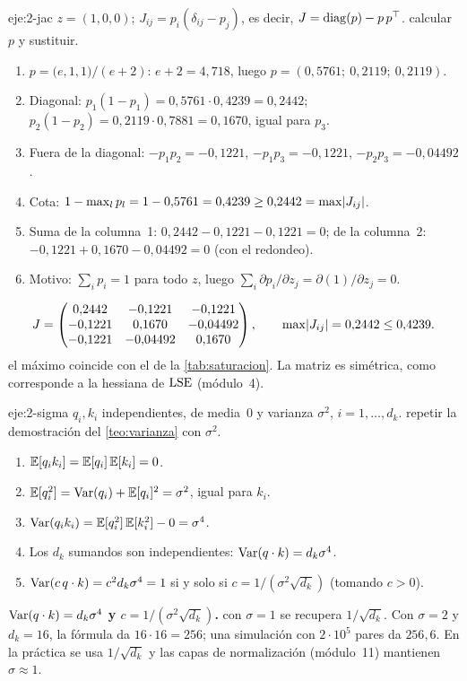 \begin{solucion}{eje:2-jac}
\datos $z=(1,0,0)$; $J_{ij}=p_i(\delta_{ij}-p_j)$, es decir, $J=\operatorname{diag}(p)-p\,p^{\top}$.
\planteamiento calcular $p$ y sustituir.
\pasos
\begin{enumerate}[label=\arabic*.]
  \item $p=\bigl(e,1,1\bigr)/(e+2)$: $e+2=4{,}718$, luego $p=(0{,}5761;\allowbreak\ 0{,}2119;\allowbreak\ 0{,}2119)$.
  \item Diagonal: $p_1(1-p_1)=0{,}5761\cdot0{,}4239=0{,}2442$; $p_2(1-p_2)=0{,}2119\cdot0{,}7881=0{,}1670$, igual para $p_3$.
  \item Fuera de la diagonal: $-p_1p_2=-0{,}1221$, $-p_1p_3=-0{,}1221$, $-p_2p_3=-0{,}04492$.
  \item Cota: $1-\max_lp_l=1-0{,}5761=0{,}4239\ge0{,}2442=\max\lvert J_{ij}\rvert$.
  \item Suma de la columna~1: $0{,}2442-0{,}1221-0{,}1221=0$; de la columna~2: $-0{,}1221+0{,}1670-0{,}04492=0$ (con el redondeo).
  \item Motivo: $\sum_ip_i=1$ para todo $z$, luego $\sum_i\partial p_i/\partial z_j=\partial(1)/\partial z_j=0$.
\end{enumerate}
\resultado
\[
J=\begin{pmatrix}0{,}2442&-0{,}1221&-0{,}1221\\-0{,}1221&0{,}1670&-0{,}04492\\-0{,}1221&-0{,}04492&0{,}1670\end{pmatrix},\qquad \max\lvert J_{ij}\rvert=0{,}2442\le0{,}4239 .
\]
\comprobacion el máximo coincide con el de la \cref{tab:saturacion}. La matriz es simétrica, como corresponde a la hessiana de $\operatorname{LSE}$ (módulo~4).
\end{solucion}

\begin{solucion}{eje:2-sigma}
\datos $q_i,k_i$ independientes, de media~0 y varianza $\sigma^{2}$, $i=1,\dots,d_k$.
\planteamiento repetir la demostración del \cref{teo:varianza} con $\sigma^{2}$.
\pasos
\begin{enumerate}[label=\arabic*.]
  \item $\mathbb{E}[q_ik_i]=\mathbb{E}[q_i]\,\mathbb{E}[k_i]=0$.
  \item $\mathbb{E}[q_i^{2}]=\operatorname{Var}(q_i)+\mathbb{E}[q_i]^{2}=\sigma^{2}$, igual para $k_i$.
  \item $\operatorname{Var}(q_ik_i)=\mathbb{E}[q_i^{2}]\,\mathbb{E}[k_i^{2}]-0=\sigma^{4}$.
  \item Los $d_k$ sumandos son independientes: $\operatorname{Var}(q\cdot k)=d_k\sigma^{4}$.
  \item $\operatorname{Var}(c\,q\cdot k)=c^{2}d_k\sigma^{4}=1$ si y solo si $c=1/(\sigma^{2}\sqrt{d_k})$ (tomando $c>0$).
\end{enumerate}
\resultado \textbf{$\operatorname{Var}(q\cdot k)=d_k\sigma^{4}$ y $c=1/(\sigma^{2}\sqrt{d_k})$.}
\comprobacion con $\sigma=1$ se recupera $1/\sqrt{d_k}$. Con $\sigma=2$ y $d_k=16$, la fórmula da $16\cdot16=256$; una simulación con $2\cdot10^{5}$ pares da $256{,}6$. En la práctica se usa $1/\sqrt{d_k}$ y las capas de normalización (módulo~11) mantienen $\sigma\approx1$.
\end{solucion}

